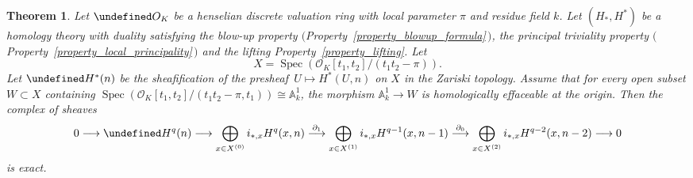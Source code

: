\documentclass[10pt,a4paper]{article}
\let\cal\undefined
\numberwithin{equation}{section}
\newtheorem{theorem}{Theorem}[section]
\newtheorem{Key lemma}[theorem]{Key lemma}
\theoremstyle{definition}
\theoremstyle{remark}
\newcommand{\bb}{\mathbb}
\newcommand{\roi}{\mathcal{O}}
\newcommand{\To}{\longrightarrow}
\newcommand{\cal}{\mathcal}
\DeclareMathOperator{\Spec}{Spec}
\newcommand{\xTo}[1]{\stackrel{#1}{\To}}
\begin{document}
\begin{theorem}\label{theorem_semi_stable}
Let $\cal O_K$ be a henselian discrete valuation ring with local parameter $\pi$ and residue field $k$. Let $(H_*,H^*)$ be a homology theory with duality satisfying the blow-up property $($Property~\ref{property_blowup_formula}\,$)$, the principal triviality property $($Property~\ref{property_local_principality}\,$)$ and the lifting Property~\ref{property_lifting}. 
Let 
$$X=\Spec(\roi_K[t_1,t_2]/(t_1^{}t_{2}^{}-\pi)).$$
Let $\cal H^*(n)$ be the sheafification of the presheaf\, $U\mapsto H^*(U,n)$ on $X$ in the Zariski topology. Assume that for every open subset $W\subset X$ containing $\Spec(\roi_K[t_1,t_2]/(t_1^{}t_{2}^{}-\pi,t_1))\cong \bb A^1_k$, the morphism $ \bb A^1_k\to W$ is homologically effaceable at the origin. Then the complex of sheaves
\begin{equation}\label{equation_Gersten_complex}
0\To \cal H^q(n) \To \bigoplus_{x\in X^{(0)}}i_{*,x}H^{q}(x,n)\xTo{\partial_1} \bigoplus_{x\in X^{(1)}}i_{*,x}H^{q-1}(x,n-1)\xTo{\partial_0} \bigoplus_{x\in X^{(2)}}i_{*,x}H^{q-2}(x,n-2)\To 0 
\end{equation}
is exact.
\end{theorem}
\end{document}
